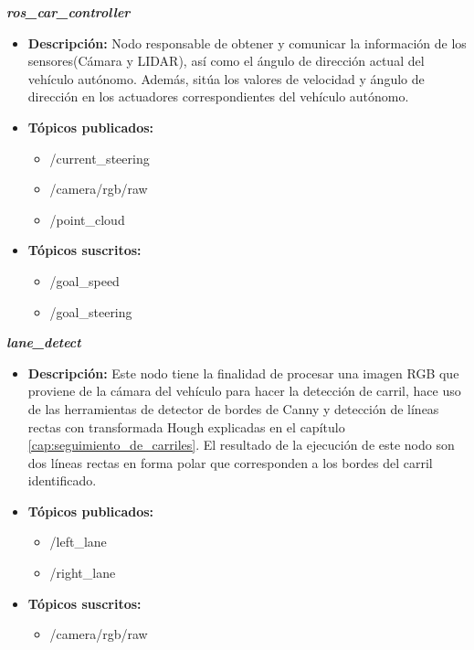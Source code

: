 \textbf{\textit{ros\_car\_controller}}
\begin{itemize}
    \item \textbf{Descripción:} Nodo responsable de obtener y comunicar la información de los sensores(Cámara y LIDAR), así como el ángulo de dirección actual del vehículo autónomo. Además, sitúa los valores de velocidad y ángulo de dirección en los actuadores correspondientes del vehículo autónomo.
    \item \textbf{Tópicos publicados:} 
    \begin{itemize}
        \item /current\_steering
        \item /camera/rgb/raw
        \item /point\_cloud
    \end{itemize}
    \item \textbf{Tópicos suscritos:}
    \begin{itemize}
        \item /goal\_speed
        \item /goal\_steering
    \end{itemize}
\end{itemize}
\hfill

\textbf{\textit{lane\_detect}}
\begin{itemize}
    \item \textbf{Descripción:} Este nodo tiene la finalidad de procesar una imagen RGB que proviene de la cámara del vehículo para hacer la detección de carril, hace uso de las herramientas de detector de bordes de Canny y detección de líneas rectas con transformada Hough explicadas en el capítulo \ref{cap:seguimiento_de_carriles}. El resultado de la ejecución de este nodo son dos líneas rectas en forma polar que corresponden a los bordes del carril identificado.
    \item \textbf{Tópicos publicados:}
    \begin{itemize}
        \item /left\_lane
        \item /right\_lane
    \end{itemize}
    \item \textbf{Tópicos suscritos:} 
\begin{itemize}
    \item /camera/rgb/raw
\end{itemize}
\end{itemize}
\hfill

